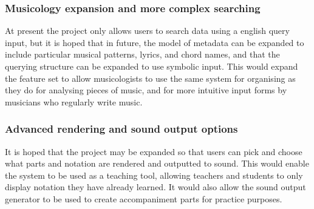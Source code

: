 \subsubsection{Musicology expansion and more complex searching}
At present the project only allows users to search data using a english query input, but it is hoped that in future, the model of metadata can be expanded to include particular musical patterns, lyrics, and chord names, and that the querying structure can be expanded to use symbolic input. This would expand the feature set to allow musicologists to use the same system for organising as they do for analysing pieces of music, and for more intuitive input forms by musicians who regularly write music.

\subsubsection{Advanced rendering and sound output options}
It is hoped that the project may be expanded so that users can pick and choose what parts and notation are rendered and outputted to sound. This would enable the system to be used as a teaching tool, allowing teachers and students to only display notation they have already learned. It would also allow the sound output generator to be used to create accompaniment parts for practice purposes.
